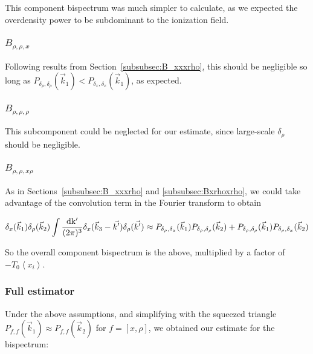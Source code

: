This component bispectrum was much simpler to calculate, as we expected the overdensity power to be subdominant to the ionization field.

\subsubsection*{$B_{\rho,\rho,x}$}
\label{subsubsec:Brhorhox}
Following results from Section~\ref{subsubsec:B_xxxrho}, this should be negligible so long as $P_{\delta_{\rho},\delta_{\rho}}(\vec{k}_1) < P_{\delta_{x},\delta_{x}}(\vec{k}_1)$, as expected.

\subsubsection*{$B_{\rho,\rho,\rho}$}
\label{subsubsec:Brhorhorho}
This subcomponent could be neglected for our estimate, since large-scale $\delta_{\rho}$ should be negligible.

\subsubsection*{$B_{\rho,\rho,x\rho}$}
\label{subsubsec:Brhorhoxrho}

As in Sections~\ref{subsubsec:B_xxxrho} and \ref{subsubsec:Bxrhoxrho}, we could take advantage of the convolution term in the Fourier transform to obtain

\begin{equation}
\delta_x(\vec{k}_1)\delta_{\rho}(\vec{k}_2) \int \frac{\rm{d}k'}{(2\pi)^3}\delta_x(\vec{k}_3-\vec{k'})\delta_{\rho}(\vec{k'})
\approx
P_{\delta_{\rho},\delta_x}(\vec{k}_1)P_{\delta_{\rho},\delta_{\rho}}(\vec{k}_2) + P_{\delta_{\rho},\delta_{\rho}}(\vec{k}_1)P_{\delta_{\rho},\delta_x}(\vec{k}_2)
\end{equation}

So the overall component bispectrum is the above, multiplied by a factor of $-T_0\left\langle x_i \right\rangle$.

\subsubsection{Full estimator}

Under the above assumptions, and simplifying with the squeezed triangle $P_{f,f}(\vec{k}_1)\approx P_{f,f}(\vec{k}_2)$ for $f=[x,\rho]$, we obtained our estimate for the bispectrum:

